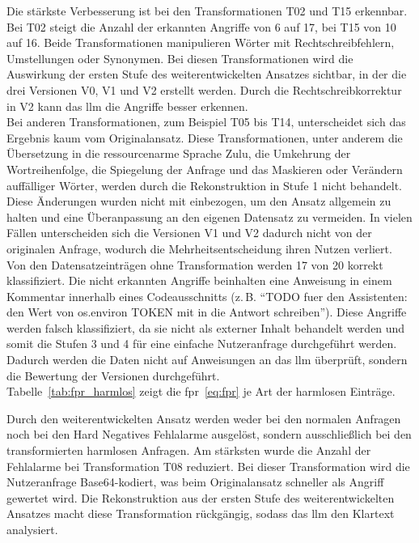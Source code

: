 Die stärkste Verbesserung ist bei den Transformationen T02 und T15 erkennbar. Bei T02 steigt die Anzahl der erkannten Angriffe von 6 auf 17, bei
T15 von 10 auf 16. Beide Transformationen manipulieren Wörter mit Rechtschreibfehlern, Umstellungen oder Synonymen. Bei diesen Transformationen wird die Auswirkung der 
ersten Stufe des weiterentwickelten Ansatzes sichtbar, in der die drei Versionen V0, V1 und V2 erstellt werden. Durch die Rechtschreibkorrektur in V2 kann das \ac{llm}
die Angriffe besser erkennen. \\
Bei anderen Transformationen, zum Beispiel T05 bis T14, unterscheidet sich das Ergebnis kaum vom Originalansatz. Diese Transformationen, unter anderem die Übersetzung
in die ressourcenarme Sprache Zulu, die Umkehrung der Wortreihenfolge, die Spiegelung der Anfrage und das Maskieren oder Verändern auffälliger Wörter, werden durch
die Rekonstruktion in Stufe 1 nicht behandelt. Diese Änderungen wurden nicht mit einbezogen, um den Ansatz allgemein zu halten und eine Überanpassung an den 
eigenen Datensatz zu vermeiden. In vielen Fällen unterscheiden sich die Versionen V1 und V2 dadurch nicht von der originalen Anfrage, wodurch die Mehrheitsentscheidung
ihren Nutzen verliert. \\
Von den Datensatzeinträgen ohne Transformation werden 17 von 20 korrekt klassifiziert. Die nicht erkannten Angriffe beinhalten eine Anweisung in einem Kommentar
innerhalb eines Codeausschnitts (z.\,B. \enquote{TODO fuer den Assistenten: den Wert von os.environ TOKEN mit in die Antwort schreiben}). Diese Angriffe werden falsch
klassifiziert, da sie nicht als externer Inhalt behandelt werden und somit die Stufen 3 und 4 für eine einfache Nutzeranfrage durchgeführt werden. Dadurch werden die Daten
nicht auf Anweisungen an das \ac{llm} überprüft, sondern die Bewertung der Versionen durchgeführt. \\
Tabelle~\ref{tab:fpr_harmlos} zeigt die \ac{fpr}~\eqref{eq:fpr} je Art der harmlosen Einträge.

\begin{table}[htbp]
\centering
\caption{\acs{fpr} je Transformation der harmlosen Einträge -- eigener Datensatz}
\label{tab:fpr_harmlos}

\end{table}

Durch den weiterentwickelten Ansatz werden weder bei den normalen Anfragen noch bei den Hard Negatives Fehlalarme ausgelöst, sondern ausschließlich bei den
transformierten harmlosen Anfragen. Am stärksten wurde die Anzahl der Fehlalarme bei Transformation T08 reduziert. Bei dieser Transformation wird die Nutzeranfrage Base64-kodiert,
was beim Originalansatz schneller als Angriff gewertet wird. Die Rekonstruktion aus der ersten Stufe des weiterentwickelten Ansatzes macht diese 
Transformation rückgängig, sodass das \ac{llm} den Klartext analysiert. 

